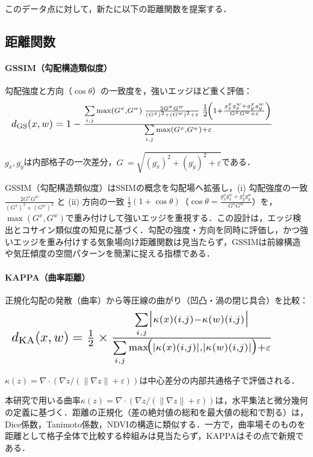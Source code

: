 \documentclass{jarticle}
\theoremstyle{definition}
\newcommand{\halfeq}[2][0.90\linewidth]{%
  \begin{equation}
    \makebox[\linewidth][l]{\resizebox{#1}{!}{\ensuremath{#2}}}%
  \end{equation}
}
\begin{document}
このデータ点に対して，新たに以下の距離関数を提案する．

\subsection{距離関数}
\paragraph{GSSIM（勾配構造類似度）}
勾配強度と方向（$\cos\theta$）の一致度を，強いエッジほど重く評価：
\halfeq{%
d_{\mathrm{GS}}(x,w)=1-
\frac{\sum\limits_{i,j} \max(G^x,G^w)\;
\frac{2G^xG^w}{(G^x)^2+(G^w)^2+\varepsilon}\;
\tfrac{1}{2}\!\left(1+\frac{g_x^x g_x^w+g_y^x g_y^w}{G^x G^w+\varepsilon}\right)
}{\sum\limits_{i,j}\max(G^x,G^w)+\varepsilon}%
}
$g_x^\cdot,g_y^\cdot$は内部格子の一次差分，$G^\cdot=\sqrt{(g_x^\cdot)^2+(g_y^\cdot)^2+\varepsilon}$である．

GSSIM（勾配構造類似度）はSSIMの概念を勾配場へ拡張し，(i) 勾配強度の一致 $\frac{2G^xG^w}{(G^x)^2+(G^w)^2}$ と (ii) 方向の一致 $\tfrac{1}{2}(1+\cos\theta)$（$\cos\theta=\tfrac{g_x^x g_x^w+g_y^x g_y^w}{G^x G^w}$）を，$\max(G^x,G^w)$で重み付けして強いエッジを重視する．この設計は，エッジ検出\cite{canny2009computational,marr1980theory}とコサイン類似度の知見に基づく．勾配の強度・方向を同時に評価し，かつ強いエッジを重み付けする気象場向け距離関数は見当たらず，GSSIMは前線構造や気圧傾度の空間パターンを簡潔に捉える指標である．

\paragraph{KAPPA（曲率距離）}
正規化勾配の発散（曲率）から等圧線の曲がり（凹凸・渦の閉じ具合）を比較：
\halfeq{%
d_{\mathrm{KA}}(x,w)=\tfrac{1}{2}\times
\frac{\sum\limits_{i,j}\bigl|\kappa(x)(i,j)-\kappa(w)(i,j)\bigr|}
{\sum\limits_{i,j}\max\!\bigl(|\kappa(x)(i,j)|,|\kappa(w)(i,j)|\bigr)+\varepsilon}%
}
$\kappa(z)=\nabla\cdot\left(\nabla z/(\|\nabla z\|+\varepsilon)\right)$は中心差分の内部共通格子で評価される．

本研究で用いる曲率$\kappa(z)=\nabla\cdot(\nabla z/(\|\nabla z\|+\varepsilon))$は，水平集法\cite{osher1988fronts}と微分幾何\cite{docarmo1976differential}の定義に基づく．距離の正規化（差の絶対値の総和を最大値の総和で割る）は，Dice係数\cite{dice1945measures}，Tanimoto係数\cite{tanimoto1958elementary}，NDVI\cite{jw1973monitoring}の構造に類似する．一方で，曲率場そのものを距離として格子全体で比較する枠組みは見当たらず，KAPPAはその点で新規である．
\end{document}
